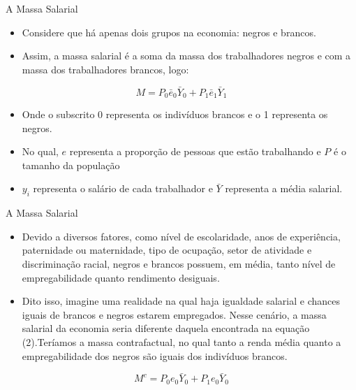 \documentclass[10pt, xcolor=x11names,compress]{beamer}
\begin{document}
	\begin{frame}{A Massa Salarial}
	\begin{itemize}
		\item Considere que há apenas dois grupos na economia: negros e brancos.
		\item Assim, a massa salarial é a soma da massa dos trabalhadores negros e com a massa dos trabalhadores brancos, logo:
	\end{itemize}
	\begin{equation}
	M =  P_{0}\bar{e}_{0} \bar{Y}_{0} + P_{1}\bar{e}_{1} \bar{Y}_{1} 
	\end{equation}
	\begin{itemize}
		\item 	Onde o subscrito 0 representa os indivíduos brancos e o 1 representa os negros. 
		\item	No qual, $e$ representa a proporção de pessoas que estão trabalhando e $P$ é o tamanho da população
		\item	$y_{i}$ representa o salário de cada trabalhador e $\bar{Y}$ representa a média salarial. 
	\end{itemize}	
\end{frame}	

	\begin{frame}{A Massa Salarial}
	\begin{itemize}
		\item 	Devido a diversos fatores, como nível de escolaridade, anos de experiência, paternidade ou maternidade, tipo de ocupação, setor de atividade e discriminação racial, negros e brancos possuem, em média, tanto nível de empregabilidade quanto rendimento desiguais.
		\item 	Dito isso, imagine uma realidade na qual haja igualdade salarial e chances iguais de brancos e negros estarem empregados. Nesse cenário, a massa salarial da economia seria diferente daquela encontrada na equação (2).Teríamos a massa contrafactual, no qual tanto a renda média quanto a empregabilidade dos negros são iguais dos indivíduos brancos.
	\end{itemize}
	\begin{equation}
		M^{c} = P_{0}e_{0}\bar{Y}_{0} + P_{1}e_{0}\bar{Y}_{0}
	\end{equation}	
\end{frame}	
\end{document}
